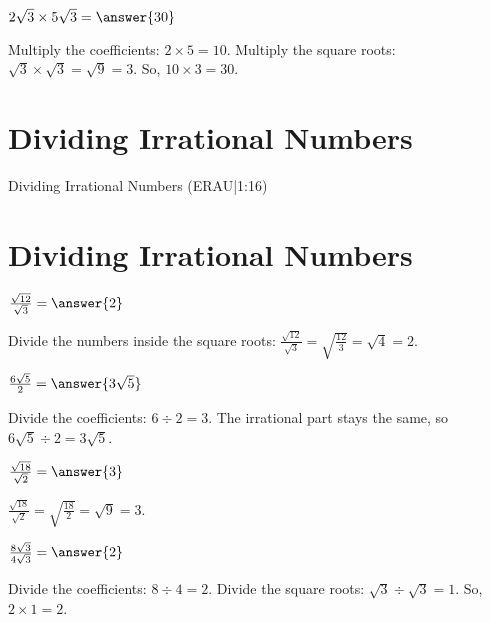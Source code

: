 \documentclass{ximera}
\begin{document}
\begin{problem}
$2\sqrt{3} \times 5\sqrt{3} = \answer{30}$

\begin{feedback}
Multiply the coefficients: $2 \times 5 = 10$. Multiply the square roots: $\sqrt{3} \times \sqrt{3} = \sqrt{9} = 3$. So, $10 \times 3 = 30$.
\end{feedback}
\end{problem}

\section*{Dividing Irrational Numbers}

Dividing Irrational Numbers (ERAU|1:16)


\section*{Dividing Irrational Numbers}

\begin{problem}
$\frac{\sqrt{12}}{\sqrt{3}} = \answer{2}$

\begin{feedback}
Divide the numbers inside the square roots: $\frac{\sqrt{12}}{\sqrt{3}} = \sqrt{\frac{12}{3}} = \sqrt{4} = 2$.
\end{feedback}
\end{problem}

\begin{problem}
$\frac{6\sqrt{5}}{2} = \answer{3\sqrt{5}}$

\begin{feedback}
Divide the coefficients: $6 \div 2 = 3$. The irrational part stays the same, so $6\sqrt{5} \div 2 = 3\sqrt{5}$.
\end{feedback}
\end{problem}

\begin{problem}
$\frac{\sqrt{18}}{\sqrt{2}} = \answer{3}$

\begin{feedback}
$\frac{\sqrt{18}}{\sqrt{2}} = \sqrt{\frac{18}{2}} = \sqrt{9} = 3$.
\end{feedback}
\end{problem}

\begin{problem}
$\frac{8\sqrt{3}}{4\sqrt{3}} = \answer{2}$

\begin{feedback}
Divide the coefficients: $8 \div 4 = 2$. Divide the square roots: $\sqrt{3} \div \sqrt{3} = 1$. So, $2 \times 1 = 2$.
\end{feedback}
\end{problem}
\end{document}

